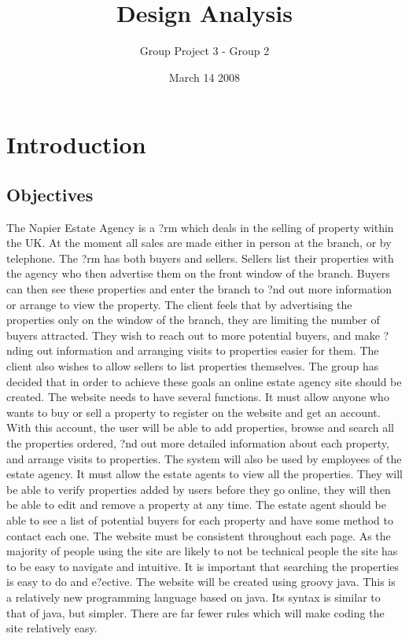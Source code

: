 \documentclass[a4paper,12pt]{article}
\title{Design Analysis}
\author{Group Project 3 - Group 2}
\date{March 14 2008}
\begin{document}
\maketitle
\newpage
\tableofcontents
\newpage



\section{Introduction}
\subsection{Objectives}
The Napier Estate Agency is a ?rm which deals in the selling of property within the UK. At the moment all sales are made either in person at the branch, or by telephone. The ?rm has both buyers and sellers. Sellers list their properties with the agency who then advertise them on the front window of the branch. Buyers can then see these properties and enter the branch to ?nd out more information or arrange to view the property.
The client feels that by advertising the properties only on the window of the branch, they are limiting the number of buyers attracted. They wish to reach out to more potential buyers, and make ?nding out information and arranging visits to properties easier for them. The client also wishes to allow sellers to list properties themselves. The group has decided that in order to achieve these goals an online estate agency site should be created.
The website needs to have several functions. It must allow anyone who wants to buy or sell a property to register on the website and get an account.
With this account, the user will be able to add properties, browse and search all the properties ordered, ?nd out more detailed information about each property, and arrange visits to properties.
The system will also be used by employees of the estate agency. It must allow the estate agents to view all the properties. They will be able to verify properties added by users before they go online, they will then be able to edit and remove a property at any time. The estate agent should be able to see a list of potential buyers for each property and have some method to contact each one.
The website must be consistent throughout each page. As the majority of people using the site are likely to not be technical people the site has to be easy to navigate and intuitive. It is important that searching the properties is easy to do and e?ective.
The website will be created using groovy java. This is a relatively new programming language based on java. Its syntax is similar to that of java, but simpler. There are far fewer rules which will make coding the site relatively easy.
\end{document}
